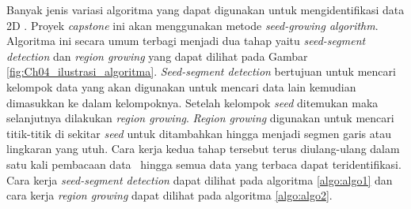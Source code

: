 Banyak jenis variasi algoritma yang dapat digunakan untuk mengidentifikasi data 2D \lidar. Proyek \textit{capstone} ini akan menggunakan metode \textit{seed-growing algorithm}\cite{d3}.  
Algoritma ini secara umum terbagi menjadi dua tahap yaitu \textit{seed-segment detection} dan \textit{region growing} yang dapat dilihat pada Gambar \ref*{fig:Ch04_ilustrasi_algoritma}. \textit{Seed-segment detection} bertujuan untuk mencari kelompok data yang akan digunakan untuk mencari data lain kemudian dimasukkan ke dalam kelompoknya. Setelah kelompok \textit{seed} ditemukan maka selanjutnya dilakukan \textit{region growing}. \textit{Region growing} digunakan untuk mencari titik-titik di sekitar \textit{seed} untuk ditambahkan hingga menjadi segmen garis atau lingkaran yang utuh. Cara kerja kedua tahap tersebut terus diulang-ulang dalam satu kali pembacaan data \lidar\ hingga semua data yang terbaca dapat teridentifikasi. Cara kerja \textit{seed-segment detection} dapat dilihat pada algoritma \ref{algo:algo1} dan cara kerja \textit{region growing} dapat dilihat pada algoritma \ref{algo:algo2}.

